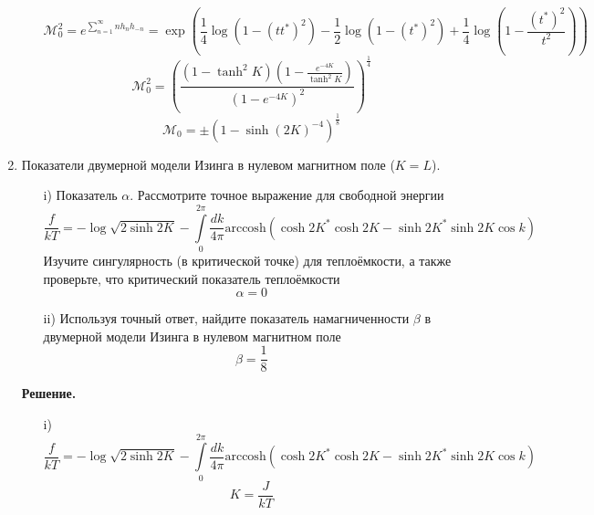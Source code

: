 \documentclass[12pt]{article}
\theoremstyle{definition}
\begin{document}
\begin{enumerate}
\begin{itemize}
        \begin{equation*}
            \mathcal{M}_0^2=e^{\sum\limits_{n=1}^\infty nh_nh_{-n}}=\exp\left(\frac{1}{4}\log(1-(tt^*)^2)-\frac{1}{2}\log(1-(t^*)^2)+\frac{1}{4}\log\left(1-\frac{(t^*)^2}{t^2}\right)\right)
        \end{equation*}
        \begin{equation}
            \mathcal{M}_0^2=\left(\frac{(1-\tanh^2K)(1-\frac{e^{-4K}}{\tanh^2K})}{(1-e^{-4K})^2}\right)^\frac{1}{4}
        \end{equation}
        \begin{equation}
            \boxed{\mathcal{M}_0=\pm(1-\sinh(2K)^{-4})^\frac{1}{8}}
        \end{equation}
    \end{itemize}
    \item Показатели двумерной модели Изинга в нулевом магнитном поле ($K=L$).
    \begin{itemize}
        \item[i)] Показатель $\alpha$. Рассмотрите точное выражение для свободной энергии
        \begin{equation*}
            \frac{f}{kT}=-\log\sqrt{2\sinh2K}-\int\limits_0^{2\pi}\frac{dk}{4\pi}
            \text{arccosh}(\cosh2K^*\cosh2K-\sinh2K^*\sinh2K\cos k)
        \end{equation*}
        Изучите сингулярность (в критической точке) для теплоёмкости, а также проверьте, что критический показатель теплоёмкости
        \begin{equation}
            \alpha=0
        \end{equation}
        \item[ii)] Используя точный ответ, найдите показатель намагниченности $\beta$ в двумерной модели Изинга в нулевом магнитном поле
        \begin{equation}
            \beta=\frac{1}{8}
        \end{equation}
    \end{itemize}
    \textbf{Решение.}
    \begin{itemize}
        \item[i)]
        \begin{equation*}
            \frac{f}{kT}=-\log\sqrt{2\sinh2K}-\int\limits_0^{2\pi}\frac{dk}{4\pi}
            \text{arccosh}(\cosh2K^*\cosh2K-\sinh2K^*\sinh2K\cos k)
        \end{equation*}
        \begin{equation}
            K=\frac{J}{kT}
        \end{equation}

\end{itemize}
\end{enumerate}
\end{document}
